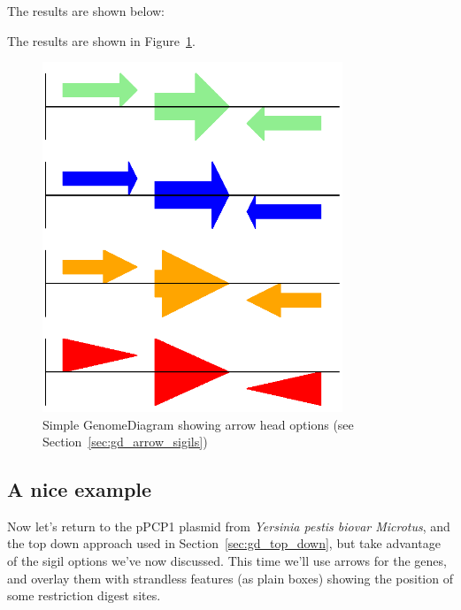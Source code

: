 \documentclass{report}
\begin{document}
\begin{htmlonly}
\noindent The results are shown below:


\end{htmlonly}
\begin{latexonly}
\noindent The results are shown in Figure~\ref{fig:gd_sigil_arrow_heads}.
\begin{figure}[htbp]
\centering
\includegraphics[width=0.8\textwidth]{images/GD_sigil_arrow_heads.png}
\caption{Simple GenomeDiagram showing arrow head options
(see Section~\ref{sec:gd_arrow_sigils})}
\label{fig:gd_sigil_arrow_heads}
\end{figure}
\end{latexonly}

\subsection{A nice example}
\label{sec:gd_nice_example}

Now let's return to the pPCP1 plasmid from \textit{Yersinia pestis biovar
Microtus}, and the top down approach used in Section~\ref{sec:gd_top_down},
but take advantage of the sigil options we've now discussed.  This time
we'll use arrows for the genes, and overlay them with strandless features
(as plain boxes) showing the position of some restriction digest sites.
\end{document}
